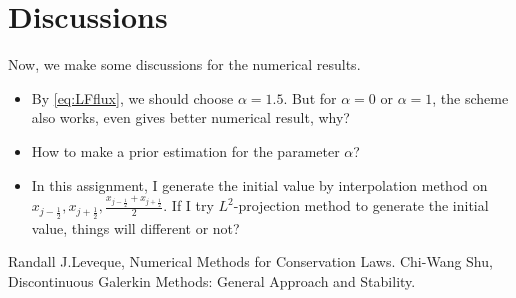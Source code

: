 \documentclass[a4paper]{article}
\begin{document}
\section{Discussions}
Now, we make some discussions for the numerical results. 
\begin{itemize}
    \item By \eqref{eq:LFflux}, we should choose $\alpha=1.5$. 
    But for $\alpha=0$ or $\alpha=1$, the scheme also works, even gives better numerical 
    result, why?
    \item How to make a prior estimation for the parameter $\alpha$?
    \item In this assignment, I generate the initial value by interpolation method 
    on $x_{j-\frac{1}{2}},x_{j+\frac{1}{2}},\frac{x_{j-\frac{1}{2}}+x_{j+\frac{1}{2}}}{2}$. 
    If I try $L^{2}$-projection method to generate the initial value, things will 
    different or not?
\end{itemize}
\begin{thebibliography}{99}
     Randall J.Leveque, Numerical Methods for Conservation Laws.
     Chi-Wang Shu, Discontinuous Galerkin Methods: General Approach and Stability.
\end{thebibliography}
\end{document}
